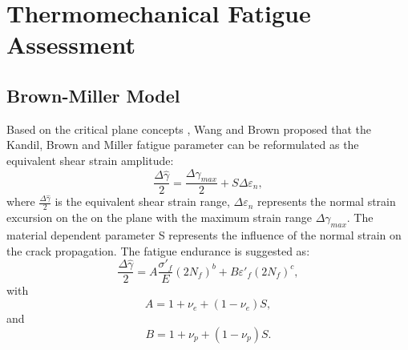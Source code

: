 \documentclass[preprint,5p,twocolumn,11pt,sort&compress]{elsarticle}
\begin{document}
\section{ Thermomechanical Fatigue Assessment}

\subsection{Brown-Miller Model}
Based on the critical plane concepts \cite{Brown2006}, Wang and Brown \cite{Wang1993} proposed that the Kandil, Brown and Miller fatigue parameter \cite{Kandil1982} can be reformulated as the equivalent shear strain amplitude:
\begin{equation}
\frac{{\Delta \hat \gamma }}{2} = \frac{{\Delta {\gamma _{max}}}}{2} + S\Delta {\varepsilon _n},
\label{Equ:ShearStrainBM}
\end{equation}
where $\frac{{\Delta \hat \gamma }}{2}$ is the equivalent shear strain range, $\Delta {\varepsilon _n}$ represents the normal strain excursion on the on the plane with the maximum strain range $\Delta {\gamma _{max}}$. The material dependent parameter S represents the influence of the normal strain on the crack propagation.
The fatigue endurance is suggested as:
\begin{equation}
\frac{{\Delta \hat \gamma }}{2} = A\frac{{{{\sigma '}_f}}}{E}{\left( {2{N_f}} \right)^b} + B{{\varepsilon '}_f}{\left( {2{N_f}} \right)^c},
\end{equation}
with
\[A = 1 + {\nu _e} + \left( {1 - {\nu _e}} \right)S,\]
and
\[B = 1 + {\nu _p} + \left( {1 - {\nu _p}} \right)S.\]
\end{document}
